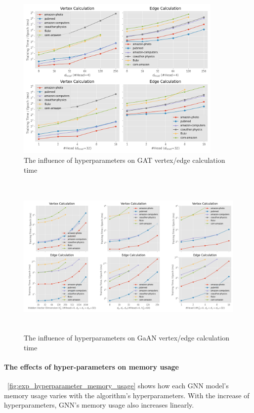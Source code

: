 \begin{figure}
	\centering
    \includegraphics[height=8cm]{figs/experiments/exp_hyperparameter_on_vertex_edge_phase_time_gat.png}
    \caption{The influence of hyperparameters on GAT vertex/edge calculation time}
	\label{fig:exp_hyperparameter_on_vertex_edge_phase_time_gat}
\end{figure}

\begin{figure}
	\centering
    \includegraphics[height=8cm]{figs/experiments/exp_hyperparameter_on_vertex_edge_phase_time_gaan.png}
    \caption{The influence of hyperparameters on GaAN vertex/edge calculation time}
	\label{fig:exp_hyperparameter_on_vertex_edge_phase_time_gaan}
\end{figure}

\paragraph{The effects of hyper-parameters on memory usage}
\figurename~\ref{fig:exp_hyperparameter_memory_usage} shows how each GNN model's memory usage varies with the algorithm's hyperparameters.
With the increase of hyperparameters, GNN's memory usage also increases linearly.

